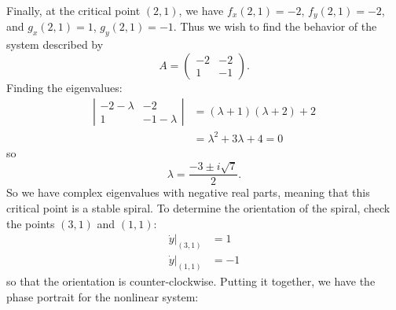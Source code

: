 \documentclass{article}
\begin{document}
\begin{itemize}
\begin{itemize}
        Finally, at the critical point $(2,1)$, we have $f_x(2,1) = -2$, $f_y(2,1) = -2$, and $g_x(2,1) = 1$, $g_y(2,1) = -1$. Thus we wish to find the behavior of the system described by 
        \[A = \begin{pmatrix}
            -2 & -2\\
            1 & -1
        \end{pmatrix}.\]
        Finding the eigenvalues:
        \begin{align*}
            \left|\begin{matrix}
                -2-\lambda & -2\\
                1 & -1-\lambda
            \end{matrix}\right| &= (\lambda + 1)(\lambda + 2) + 2\\
            &= \lambda^2 + 3\lambda + 4 = 0
        \end{align*}
        so 
        \[\lambda = \frac{-3 \pm i\sqrt{7}}{2}.\]
        So we have complex eigenvalues with negative real parts, meaning that this critical point is a stable spiral. To determine the orientation of the spiral, check the points $(3,1)$ and $(1,1)$:
        \begin{align*}
            \dot{y}|_{(3,1)} &= 1\\
            \dot{y}|_{(1,1)} &= -1
        \end{align*}
        so that the orientation is counter-clockwise.
        \newline
        Putting it together, we have the phase portrait for the nonlinear system:
        \begin{center}

\end{center}
\end{itemize}
\end{itemize}
\end{document}
